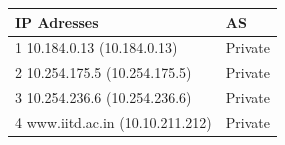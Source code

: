 \documentclass{article}
\begin{document}
\begin{table}[]
\begin{tabular}{|l|l|}
\hline
\textbf{IP Adresses}                                                        & \textbf{AS}                                                           \\ \hline
1  10.184.0.13 (10.184.0.13)                                                & Private                                                               \\ \hline
2  10.254.175.5 (10.254.175.5)                                              & Private                                                               \\ \hline
3  10.254.236.6 (10.254.236.6)                                              & Private                                                               \\ \hline
4  www.iitd.ac.in (10.10.211.212)                                           & Private\\ \hline
\end{tabular}
\end{table}
\end{document}

